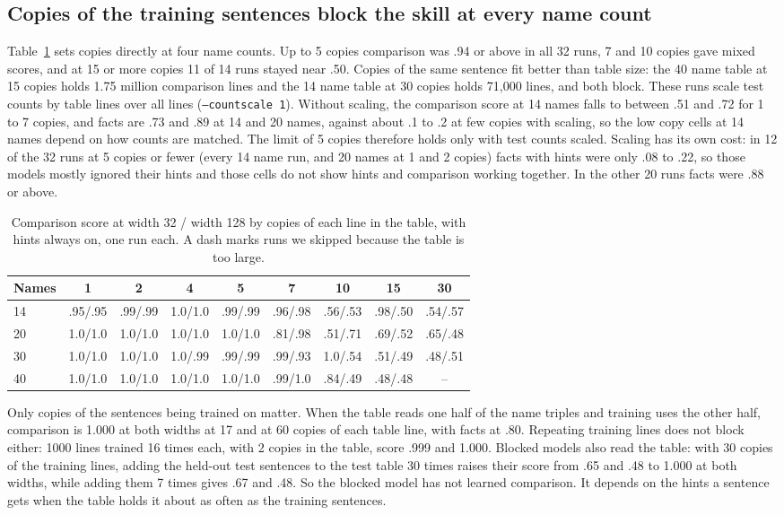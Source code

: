 \documentclass[11pt]{article}
\begin{document}
\subsection{Copies of the training sentences block the skill at every name count}
Table~\ref{tab:grid} sets copies directly at four name counts. Up to 5 copies comparison was .94 or above in all 32 runs, 7 and 10 copies gave mixed scores, and at 15 or more copies 11 of 14 runs stayed near .50. Copies of the same sentence fit better than table size: the 40 name table at 15 copies holds 1.75 million comparison lines and the 14 name table at 30 copies holds 71,000 lines, and both block. These runs scale test counts by table lines over all lines (\texttt{--countscale 1}). Without scaling, the comparison score at 14 names falls to between .51 and .72 for 1 to 7 copies, and facts are .73 and .89 at 14 and 20 names, against about .1 to .2 at few copies with scaling, so the low copy cells at 14 names depend on how counts are matched. The limit of 5 copies therefore holds only with test counts scaled. Scaling has its own cost: in 12 of the 32 runs at 5 copies or fewer (every 14 name run, and 20 names at 1 and 2 copies) facts with hints were only .08 to .22, so those models mostly ignored their hints and those cells do not show hints and comparison working together. In the other 20 runs facts were .88 or above.

\begin{table}[h]\centering\small
\begin{tabular}{lcccccccc}\toprule
Names & 1 & 2 & 4 & 5 & 7 & 10 & 15 & 30\\\midrule
14 & .95/.95 & .99/.99 & 1.0/1.0 & .99/.99 & .96/.98 & .56/.53 & .98/.50 & .54/.57\\
20 & 1.0/1.0 & 1.0/1.0 & 1.0/1.0 & 1.0/1.0 & .81/.98 & .51/.71 & .69/.52 & .65/.48\\
30 & 1.0/1.0 & 1.0/1.0 & 1.0/.99 & .99/.99 & .99/.93 & 1.0/.54 & .51/.49 & .48/.51\\
40 & 1.0/1.0 & 1.0/1.0 & 1.0/1.0 & 1.0/1.0 & .99/1.0 & .84/.49 & .48/.48 & --\\
\bottomrule
\end{tabular}
\caption{Comparison score at width 32 / width 128 by copies of each line in the table, with hints always on, one run each. A dash marks runs we skipped because the table is too large.}\label{tab:grid}
\end{table}

Only copies of the sentences being trained on matter. When the table reads one half of the name triples and training uses the other half, comparison is 1.000 at both widths at 17 and at 60 copies of each table line, with facts at .80. Repeating training lines does not block either: 1000 lines trained 16 times each, with 2 copies in the table, score .999 and 1.000. Blocked models also read the table: with 30 copies of the training lines, adding the held-out test sentences to the test table 30 times raises their score from .65 and .48 to 1.000 at both widths, while adding them 7 times gives .67 and .48. So the blocked model has not learned comparison. It depends on the hints a sentence gets when the table holds it about as often as the training sentences.
\end{document}
